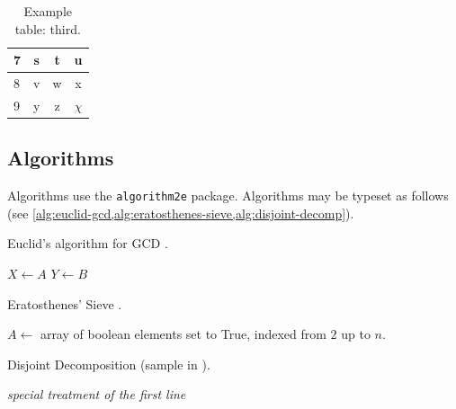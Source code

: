 \begin{table} \caption{\label{tab:example3} Example table: third.}
\begin{tabular}{l | c c c} \hline
7 & s & t & u \\ \hline
8 & v & w & x \\ \hline
9 & y & z & $\chi$ \\
\hline \end{tabular}
\end{table}

\subsection{Algorithms}
Algorithms use the \lstinline{algorithm2e} \cite{algorithm2e} package.
Algorithms may be typeset as follows
(see \cref{alg:euclid-gcd,alg:eratosthenes-sieve,alg:disjoint-decomp}).

\begin{algorithm}
\caption{\label{alg:euclid-gcd} Euclid's algorithm for \gls{GCD}
\cite{enwiki:euclid-algorithm}.}

\BlankLine
$X \gets A$\;
$Y \gets B$\;
\end{algorithm}

\begin{algorithm}
\caption{\label{alg:eratosthenes-sieve} Eratosthenes' Sieve
         \cite{enwiki:eratosthenes-sieve}.}
$A \gets$ array of boolean elements set to True, indexed from $2$ up to $n$.\;
\end{algorithm}

\begin{algorithm}
\caption{\label{alg:disjoint-decomp} Disjoint Decomposition
         (sample in \cite{algorithm2e}).}
\BlankLine
\emph{special treatment of the first line}\;
\end{algorithm}

